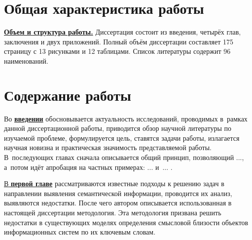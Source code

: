 
\section*{Общая характеристика работы}

\newcommand{\actuality}{\underline{\textbf{\actualityTXT}}}
\newcommand{\progress}{\underline{\textbf{\progressTXT}}}
\newcommand{\aim}{\underline{{\textbf\aimTXT}}}
\newcommand{\tasks}{\underline{\textbf{\tasksTXT}}}
\newcommand{\novelty}{\underline{\textbf{\noveltyTXT}}}
\newcommand{\influence}{\underline{\textbf{\influenceTXT}}}
\newcommand{\methods}{\underline{\textbf{\methodsTXT}}}
\newcommand{\defpositions}{\underline{\textbf{\defpositionsTXT}}}
\newcommand{\reliability}{\underline{\textbf{\reliabilityTXT}}}
\newcommand{\probation}{\underline{\textbf{\probationTXT}}}
\newcommand{\contribution}{\underline{\textbf{\contributionTXT}}}
\newcommand{\publications}{\underline{\textbf{\publicationsTXT}}}
\newcommand{\workrequirements}{\underline{\textbf{\workrequirementsTXT}}}



\underline{\textbf{Объем и структура работы.}} Диссертация состоит из введения, четырёх глав, заключения и двух приложений. Полный объём диссертации составляет 175 страницу с 13 рисунками и 12 таблицами. Список литературы содержит 96 наименований.

\section*{Содержание работы}
Во \underline{\textbf{введении}} обосновывается актуальность
исследований, проводимых в~рамках данной диссертационной работы,
приводится обзор научной литературы по изучаемой проблеме,
формулируется цель, ставятся задачи работы, излагается научная новизна
и практическая значимость представляемой работы. В~последующих главах
сначала описывается общий принцип, позволяющий ..., а~потом идёт
апробация на частных примерах: ...  и~... .

\underline{В \textbf{первой главе}} рассматриваются известные подходы к решению задач в направлении выявления семантической информации, проводится их анализ, выявляются недостатки. После чего автором описывается использованная в настоящей диссертации методология. Эта методология призвана решить недостатки в существующих моделях определения смысловой близости объектов информационных систем по их ключевым словам.

